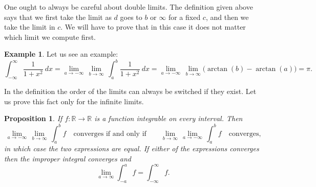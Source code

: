 \documentclass[12pt]{book}
\newcommand{\R}{{\mathbb{R}}}
\theoremstyle{plain}
\newtheorem{prop}[thm]{Proposition}
\theoremstyle{remark}
\theoremstyle{definition}
\theoremstyle{exercise}
\theoremstyle{example}
\newtheorem{example}[thm]{Example}
\begin{document}
One ought to always be careful about double limits.  The definition
given above says that we first take the limit as $d$ goes to $b$ or
$\infty$ for a fixed $c$, and then we take the limit in $c$.
We will have to prove that in this case it does not matter which limit
we compute first.

\begin{example}
Let us see an example:
\begin{equation*}
\int_{-\infty}^\infty \frac{1}{1+x^2} ~ dx
=
\lim_{a \to -\infty} \, \lim_{b \to \infty} \,
\int_{a}^b \frac{1}{1+x^2} ~ dx
=
\lim_{a \to -\infty} \, \lim_{b \to \infty}
\bigl( \arctan(b) - \arctan(a) \bigr)
=
\pi .
\end{equation*}
\end{example}

In the definition the order of the limits can always be switched if they
exist.  Let us prove this fact only for the infinite limits.

\begin{prop}
If $f \colon \R \to \R$ is a function integrable on every interval.
Then 
\begin{equation*}
\lim_{a \to -\infty} \, \lim_{b \to \infty} \, \int_a^b f
\quad \text{converges if and only if} \qquad
\lim_{b \to \infty}
\,
\lim_{a \to -\infty}
\,
\int_a^b f
\quad
\text{converges,}
\end{equation*}
in which case the two
expressions are equal.  If either of the
expressions converges then the improper integral converges and
\begin{equation*}
\lim_{a\to\infty}
\int_{-a}^a f
=
\int_{-\infty}^\infty f .
\end{equation*}
\end{prop}
\end{document}

